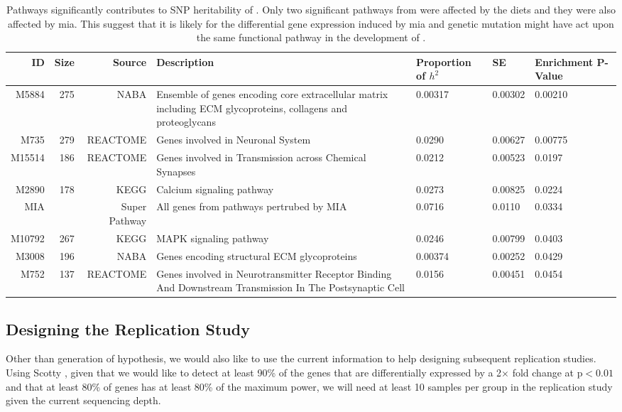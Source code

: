 \begin{landscape}
	\begin{table}
		\begin{tabular}{rrrp{9cm}p{1.7cm}p{1.5cm}p{1.7cm}}
			\toprule
			ID& Size&	Source&	Description&	Proportion of $h^2$&	SE&	Enrichment P-Value\\
			\midrule
			M5884&	275&	NABA&	Ensemble of genes encoding core extracellular matrix including ECM glycoproteins, collagens and proteoglycans&	0.00317&	0.00302&	0.00210\\
			M735&	279&	REACTOME&	Genes involved in Neuronal System&	0.0290&	0.00627&	0.00775\\
			M15514&	186&	REACTOME&	Genes involved in Transmission across Chemical Synapses&	0.0212&	0.00523&	0.0197\\
			M2890&	178&	KEGG&	Calcium signaling pathway&	0.0273&	0.00825&	0.0224\\
			MIA&	&	Super Pathway&	All genes from pathways pertrubed by MIA&	0.0716&	0.0110&	0.0334\\
			M10792&	267&	KEGG&	MAPK signaling pathway&	0.0246&	0.00799&	0.0403\\
			M3008&	196&	NABA&	Genes encoding structural ECM glycoproteins&	0.00374&	0.00252&	0.0429\\
			M752&	137&	REACTOME&	Genes involved in Neurotransmitter Receptor Binding And Downstream Transmission In The Postsynaptic Cell&	0.0156&	0.00451&	0.0454\\		
			\bottomrule
		\end{tabular}
		\caption[Pathways Significantly Contributes to SNP Heritability of Schizophrenia.]{Pathways significantly contributes to \gls{SNP} heritability of .
		Only two significant pathways from were affected by the diets and they were also affected by \gls{mia}.
		This suggest that it is likely for the differential gene expression induced by \gls{mia} and genetic mutation might have act upon the same functional pathway in the development of .
		}
		\label{tab:partitioning}
	\end{table}
\end{landscape}



\subsection{Designing the Replication Study}
Other than generation of hypothesis, we would also like to use the current information to help designing subsequent replication studies.
Using Scotty \citep{Busby2013}, given that we would like to detect at least 90\% of the genes that are differentially expressed by a 2$\times$ fold change at p$<0.01$ and that at least 80\% of genes has at least 80\% of the maximum power, we will need at least 10 samples per group in the replication study given the current sequencing depth.


